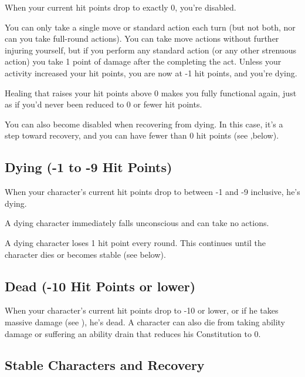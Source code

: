 When your current hit points drop to exactly 0, you're disabled.

You can only take a single move or standard action each turn (but not both, nor 
can you take full-round actions). You can take move actions without further injuring 
yourself, but if you perform any standard action (or any other strenuous action) 
you take 1 point of damage after the completing the act. Unless your activity increased 
your hit points, you are now at -1 hit points, and you're dying.

Healing that raises your hit points above 0 makes you fully functional again, just 
as if you'd never been reduced to 0 or fewer hit points.

You can also become disabled when recovering from dying. In this case, it's a step 
toward recovery, and you can have fewer than 0 hit points (see
,below).

\subsection{Dying (-1 to -9 Hit Points)}

When your character's current hit points drop to between -1 and -9 inclusive, he's 
dying.

A dying character immediately falls unconscious and can take no actions.

A dying character loses 1 hit point every round. This continues until the character 
dies or becomes stable (see below).

\subsection{Dead (-10 Hit Points or lower)}

When your character's current hit points drop to -10 or lower, or if he takes massive 
damage (see ), he's dead. A character can also die from taking ability damage 
or suffering an ability drain that reduces his Constitution to 0.

\subsection{Stable Characters and Recovery}

